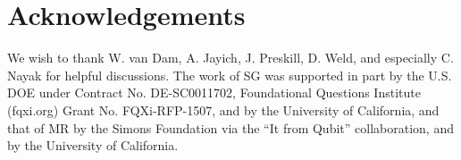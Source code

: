 \documentclass[aps,prd,groupedaddress,nofootinbib,letterpaper]{revtex4}
\begin{document}
\section{Acknowledgements}

We wish to thank 
W. van Dam, A. Jayich, J. Preskill, D. Weld, and especially C. Nayak for helpful discussions.
The work of SG was supported in part by the U.S. DOE under Contract No. 
DE-SC0011702,  Foundational Questions Institute (fqxi.org) 
Grant No. FQXi-RFP-1507, and by the University of California, and that of MR by the Simons Foundation via the ``It from Qubit'' collaboration, and by the University of California.



\end{document}
